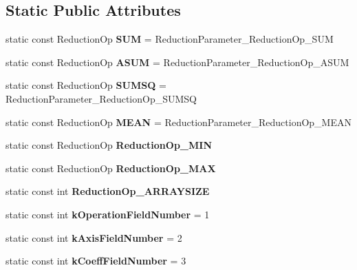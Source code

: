\subsection*{Static Public Attributes}
\begin{DoxyCompactItemize}
\item 
\mbox{\label{classcaffe_1_1_reduction_parameter_a5b64b0d017033e488d4c776d8a166e4e}} 
static const Reduction\+Op {\bfseries S\+UM} = Reduction\+Parameter\+\_\+\+Reduction\+Op\+\_\+\+S\+UM
\item 
\mbox{\label{classcaffe_1_1_reduction_parameter_ac21cf4bb9d9b26d7276a3069db0064d6}} 
static const Reduction\+Op {\bfseries A\+S\+UM} = Reduction\+Parameter\+\_\+\+Reduction\+Op\+\_\+\+A\+S\+UM
\item 
\mbox{\label{classcaffe_1_1_reduction_parameter_ab2884f666ecd7789515af55aafd955d2}} 
static const Reduction\+Op {\bfseries S\+U\+M\+SQ} = Reduction\+Parameter\+\_\+\+Reduction\+Op\+\_\+\+S\+U\+M\+SQ
\item 
\mbox{\label{classcaffe_1_1_reduction_parameter_a0163569dc1dedf96919cca07d0c7b0cf}} 
static const Reduction\+Op {\bfseries M\+E\+AN} = Reduction\+Parameter\+\_\+\+Reduction\+Op\+\_\+\+M\+E\+AN
\item 
static const Reduction\+Op {\bfseries Reduction\+Op\+\_\+\+M\+IN}
\item 
static const Reduction\+Op {\bfseries Reduction\+Op\+\_\+\+M\+AX}
\item 
static const int {\bfseries Reduction\+Op\+\_\+\+A\+R\+R\+A\+Y\+S\+I\+ZE}
\item 
\mbox{\label{classcaffe_1_1_reduction_parameter_a40dde90325e3d35b882896e47bd6fd1b}} 
static const int {\bfseries k\+Operation\+Field\+Number} = 1
\item 
\mbox{\label{classcaffe_1_1_reduction_parameter_aa06685f8b2693b4227e1390fd6aee774}} 
static const int {\bfseries k\+Axis\+Field\+Number} = 2
\item 
\mbox{\label{classcaffe_1_1_reduction_parameter_a9dd90508141078c03b3321121f408292}} 
static const int {\bfseries k\+Coeff\+Field\+Number} = 3
\end{DoxyCompactItemize}

